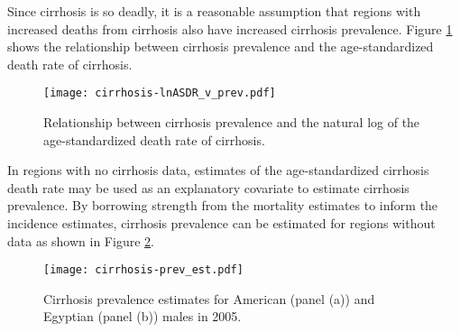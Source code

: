 Since cirrhosis is so deadly, it is a reasonable assumption that
regions with increased deaths from cirrhosis also have increased
cirrhosis prevalence.  Figure \ref{fig:app-cirrhosis asp} shows the
relationship between cirrhosis prevalence and the age-standardized
death rate of cirrhosis.

    \begin{figure}[h]
        \begin{center}
            \texttt{[image: cirrhosis-lnASDR\_v\_prev.pdf]}
            \caption{Relationship between cirrhosis prevalence and the
              natural log of the age-standardized death rate of
              cirrhosis.}
            \label{fig:app-cirrhosis asp}
        \end{center}
    \end{figure}

In regions with no cirrhosis data, estimates of the age-standardized
cirrhosis death rate may be used as an explanatory covariate to
estimate cirrhosis prevalence.  By borrowing strength from the
mortality estimates to inform the incidence estimates, cirrhosis
prevalence can be estimated for regions without data as shown in
Figure \ref{fig:app-cirrhosis prev est}.

    \begin{figure}[h]
        \begin{center}
            \texttt{[image: cirrhosis-prev\_est.pdf]}
            \caption{Cirrhosis prevalence estimates for American
              (panel (a)) and Egyptian (panel (b)) males in 2005.}
            \label{fig:app-cirrhosis prev est}
        \end{center}
    \end{figure}
